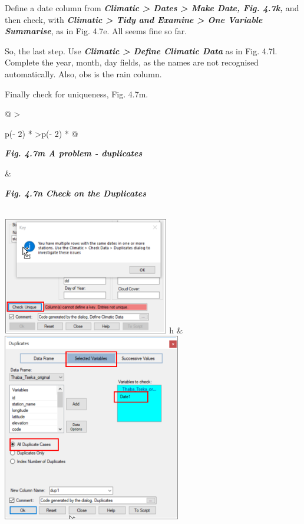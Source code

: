 \documentclass[
  letterpaper,
  DIV=11,
  numbers=noendperiod]{scrreprt}
\begin{document}
Define a date column from \textbf{\emph{Climatic \textgreater{} Dates
\textgreater{} Make Date, Fig. 4.7k,}} and then check, with
\textbf{\emph{Climatic \textgreater{} Tidy and Examine \textgreater{}
One Variable Summarise}}, as in Fig. 4.7e. All seems fine so far.

So, the last step. Use \textbf{\emph{Climatic \textgreater{} Define
Climatic Data}} as in Fig. 4.7l. Complete the year, month, day fields,
as the names are not recognised automatically. Also, obs is the rain
column.

Finally check for uniqueness, Fig. 4.7m.

\begin{longtable}[]{@{}
  >{\raggedright\arraybackslash}p{(\columnwidth - 2\tabcolsep) * }
  >{\raggedleft\arraybackslash}p{(\columnwidth - 2\tabcolsep) * }@{}}
\toprule\noalign{}
\begin{minipage}[b]{\linewidth}\raggedright
\textbf{\emph{Fig. 4.7m A problem - duplicates}}
\end{minipage} & \begin{minipage}[b]{\linewidth}\raggedleft
\textbf{\emph{Fig. 4.7n Check on the Duplicates}}
\end{minipage} \\
\midrule\noalign{}
\endhead
\bottomrule\noalign{}
\endlastfoot
\includegraphics[width=2.85934in,height=2.02184in]{figures/Fig4.7m.png}
h &
\includegraphics[width=3.06174in,height=\textheight]{figures/Fig4.7n.png} \\
\end{longtable}
\end{document}
